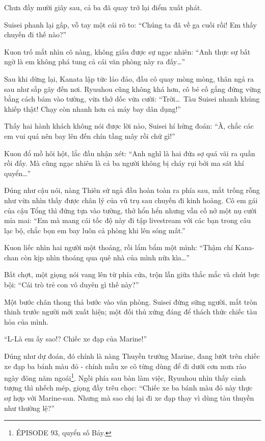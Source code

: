\documentclass[../main.tex]{subfiles}
\begin{document}
Chưa đầy mười giây sau, cả ba đã quay trở lại điểm xuất phát.

Suisei phanh lại gấp, vỗ tay một cái rõ to: ``Chúng ta đã về ga cuối rồi! Em thấy chuyến đi thế nào?''

Kuon trố mắt nhìn cô nàng, không giấu được sự ngạc nhiên: ``Anh thực sự bất ngờ là em không phá tung cả cái văn phòng này ra đấy\dots''

Sau khi dừng lại, Kanata lập tức lảo đảo, đầu cô quay mòng mòng, thân ngả ra sau như sắp gãy đến nơi. Ryuuhou cũng không khá hơn, cô bé cố gắng đứng vững bằng cách bám vào tường, vừa thở dốc vừa cười: ``Trời\dots\ Tàu Suisei nhanh khủng khiếp thật! Chạy còn nhanh hơn cả máy bay dân dụng!''

Thấy hai hành khách không nói được lời nào, Suisei hí hửng đoán: ``À, chắc các em vui quá nên bay lên đến chín tầng mây rồi chứ gì!''

Kuon đổ mồ hôi hột, lắc đầu nhận xét: ``Anh nghĩ là hai đứa sợ quá vãi ra quần rồi đấy. Mà cũng ngạc nhiên là cả ba người không bị cháy rụi bởi ma sát khí quyển\dots''

Đúng như cậu nói, nàng Thiên sứ ngả đầu hoàn toàn ra phía sau, mắt trống rỗng như vừa nhìn thấy được chân lý của vũ trụ sau chuyến đi kinh hoàng. Cô em gái của cậu Tổng thì đứng tựa vào tường, thở hổn hển nhưng vẫn cố nở một nụ cười mỉa mai: ``Em mà mang cái tốc độ này đi tập livestream với các bạn trong câu lạc bộ, chắc bọn em bay luôn cả phòng khi lên sóng mất.''

Kuon liếc nhìn hai người một thoáng, rồi lẩm bẩm một mình: ``Thậm chí Kana-chan còn kịp nhìn thoáng qua quê nhà của mình nữa kìa\dots''

Bất chợt, một giọng nói vang lên từ phía cửa, trộn lẫn giữa thắc mắc và chút bực bội: ``Cái trò trẻ con vô duyên gì thế này?''

Một bước chân thong thả bước vào văn phòng. Suisei đứng sững người, mắt tròn thinh trước người mới xuất hiện; một đối thủ xứng đáng để thách thức chiếc tàu hỏa của mình.

``L-Là em ấy sao!? Chiếc xe đạp của Marine!''


Đúng như dự đoán, đó chính là nàng Thuyền trưởng Marine, đang lướt trên chiếc xe đạp ba bánh màu đỏ - chính mẫu xe cô từng dùng để đi dưới cơn mưa rào ngày đông năm ngoái\footnote{{\flaregothic ÉPISODE 93}, quyển số Bảy.}. Ngồi phía sau bàn làm việc, Ryuuhou nhìn thấy cảnh tượng thì nhếch mép, giọng đầy trêu chọc: ``Chiếc xe ba bánh màu đỏ này thực sự hợp với Marine-san. Nhưng mà sao chị lại đi xe đạp thay vì dùng tàu thuyền như thường lệ?''
\end{document}
